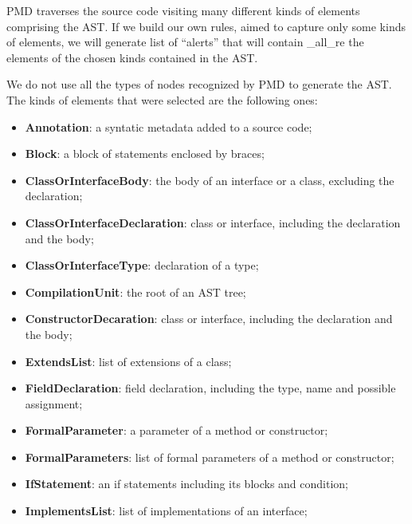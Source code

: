 \documentclass[
]{article}
\begin{document}
PMD traverses the source code visiting many different kinds of elements
comprising the AST. If we build our own rules, aimed to capture only some
kinds of elements, we will generate list of ``alerts'' that will contain
\_all\_re the elements of the chosen kinds contained in the AST.

%
%

We do not use all the types of nodes recognized by PMD to generate the AST. 
The kinds of elements that were selected are the following ones:

\begin{itemize}
\item \textbf{Annotation}: a syntatic metadata added to a source code;

\item \textbf{Block}: a block of statements enclosed by braces;

\item \textbf{ClassOrInterfaceBody}: the body of an interface or a class, excluding the declaration;

\item \textbf{ClassOrInterfaceDeclaration}: class or interface, including the declaration and the body;

\item \textbf{ClassOrInterfaceType}: declaration of a type;

\item \textbf{CompilationUnit}: the root of an AST tree;

\item \textbf{ConstructorDecaration}: class or interface, including the declaration and the body;

\item \textbf{ExtendsList}: list of extensions of a class;

\item \textbf{FieldDeclaration}: field declaration, including the type, name and possible assignment;

\item \textbf{FormalParameter}: a parameter of a method or constructor;

\item \textbf{FormalParameters}:  list of formal parameters of a method or constructor;

\item \textbf{IfStatement}: an if statements including its blocks and condition;

\item \textbf{ImplementsList}: list of implementations of an interface;


\end{itemize}
\end{document}
